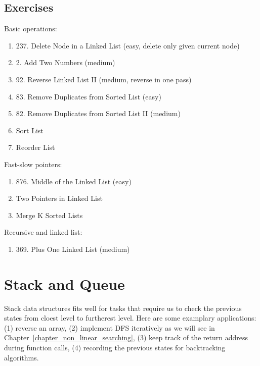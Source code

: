 \documentclass[../main.tex]{subfiles}
\begin{document}
\subsection{Exercises}
Basic operations:
\begin{enumerate}
    \item 237. Delete Node in a Linked List (easy, delete only given current node)
    \item 2. Add Two Numbers (medium)
    \item 92. Reverse Linked List II (medium, reverse in one pass)
    \item 83. Remove Duplicates from Sorted List (easy)
    \item 82. Remove Duplicates from Sorted List II (medium)
    \item Sort List
    \item Reorder List
\end{enumerate}

Fast-slow pointers:
\begin{enumerate}
    \item 876. Middle of the Linked List (easy)
    \item Two Pointers in Linked List
    \item Merge K Sorted Lists
\end{enumerate}

Recursive and linked list:
\begin{enumerate}
\item 369. Plus One Linked List (medium)
\end{enumerate}






\section{Stack and Queue}
\label{chapter_queue_stack}
Stack data structures fits well for tasks that require us to check the previous states from cloest level to furtherest level. Here are some examplary applications: (1) reverse an array, (2) implement DFS iteratively as we will see in Chapter~\ref{chapter_non_linear_searching}, (3) keep track of the return address during function calls, (4) recording the previous states for backtracking algorithms. 
\end{document}
